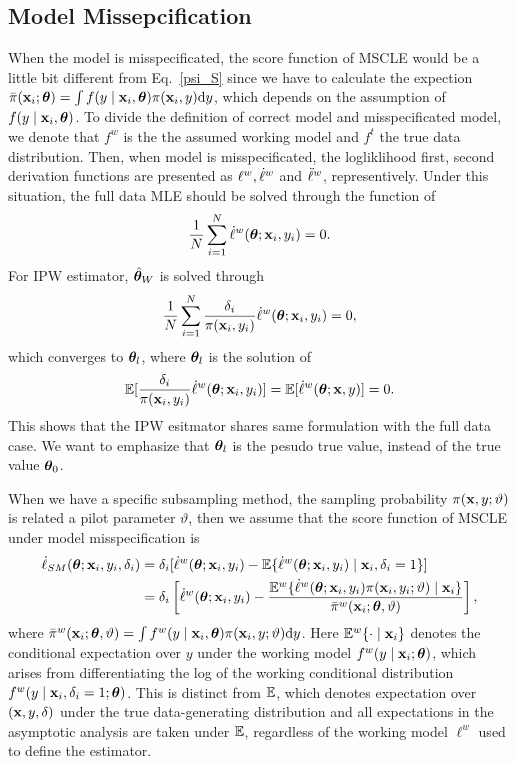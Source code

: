\documentclass[12pt,hidelinks]{article}
\begin{document}
\subsection{Model Missepcification}

When the model is misspecificated, the score function of MSCLE would be a little bit different from Eq.~\eqref{psi_S} 
since we have to calculate the expection $\bar{\pi}(\mathbf{x}_i; \bm{\theta}) = \int f(y \mid \mathbf{x}_i,\bm{\theta}) \pi(\mathbf{x}_i, y) \mathrm{d}y$, which depends on the assumption of $f(y \mid \mathbf{x}_i,\bm{\theta})$.
To divide the definition of correct model and misspecificated model, we denote that $f^w$ is the the assumed working model and $f^t$ the true data distribution. 
Then, when model is misspecificated, the logliklihood first, second derivation functions are presented as $\ell^w, \dot \ell^w$ and $\ddot \ell^w$, representively.
Under this situation, the full data MLE should be solved through the function of 
\begin{equation*}
    \frac{1}{N} \sum_{i=1}^{N} \dot \ell^w (\bm{\theta}; \mathbf{x}_i,y_i) = 0.
\end{equation*}
For IPW estimator, ${\hat{\bm{\theta}}}_W$ is solved through
\begin{align}\label{eq:EW_mis}
    \frac{1}{N} \sum_{i=1}^{N} \frac{\delta_i}{\pi(\mathbf{x}_i,y_i)} \dot \ell^w (\bm{\theta}; \mathbf{x}_i,y_i) = 0,
\end{align}
which converges to $\bm{\theta}_l$, where $\bm{\theta}_l$ is the solution of
\begin{equation*}
    \mathbb{E} [\frac{\delta_i}{\pi(\mathbf{x}_i,y_i)} \dot \ell^w (\bm{\theta}; \mathbf{x}_i,y_i)] = \mathbb{E} [\dot \ell^w (\bm{\theta}; \mathbf{x},y)]= 0.
\end{equation*}
This shows that the IPW esitmator shares same formulation with the full data case.
We want to emphasize that $\bm{\theta}_l$ is the pesudo true value, instead of the true value $\bm{\theta}_0$.

When we have a specific subsampling method, the sampling probability $\pi(\mathbf{x}, y;\vartheta)$ is related a pilot parameter $\vartheta$, 
then we assume that the score function of MSCLE under model misspecification is 
\begin{align}
    \dot \ell_{SM}(\bm{\theta}; \mathbf{x}_i, y_i, \delta_i) &= \delta_i [\dot \ell^w(\bm{\theta}; \mathbf{x}_i, y_i) - \mathbb{E}\{\dot \ell^w(\bm{\theta}; \mathbf{x}_i, y_i) \mid \mathbf{x}_i, \delta_i = 1\} ] \notag \\
    &= \delta_i \left[\dot \ell^w(\bm{\theta}; \mathbf{x}_i, y_i) -  \frac{\mathbb{E}^w \{ \dot \ell^w (\bm{\theta}; \mathbf{x}_i, y_i) \pi(\mathbf{x}_i, y_i;\vartheta) \mid \mathbf{x}_i\}}{\bar{\pi}^w(\mathbf{x}_i; \bm{\theta}, \vartheta)}  \right],
\end{align}
where $\bar{\pi}^w(\mathbf{x}_i; \bm{\theta}, \vartheta) = \int f^w(y \mid \mathbf{x}_i,\bm{\theta}) \pi(\mathbf{x}_i, y; \vartheta) \mathrm{d}y$.
Here $\mathbb{E}^w\{\cdot \mid \mathbf{x}_i\}$ denotes the conditional expectation over $y$ under the working model $f^w(y \mid \mathbf{x}_i; \bm{\theta})$, which arises from differentiating the log of the working conditional distribution $f^w(y \mid \mathbf{x}_i, \delta_i=1; \bm{\theta})$. 
This is distinct from $\mathbb{E}$, which denotes expectation over $(\mathbf{x}, y, \delta)$ under the true data-generating distribution and all expectations in the asymptotic analysis are taken under $\mathbb{E}$, regardless of the working model $\ell^w$ used to define the estimator. 
\end{document}
